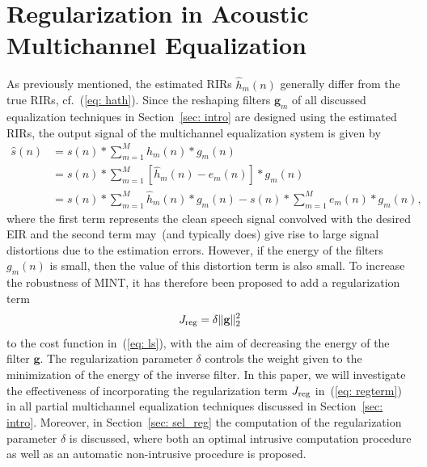 \documentclass[10pt]{IEEEtran}
\begin{document}
\section{Regularization in Acoustic Multichannel Equalization}
\label{sec: reg}
As previously mentioned, the estimated RIRs $\hat{h}_m(n)$ generally differ from the true RIRs, cf.~(\ref{eq: hath}).
Since the reshaping filters $\mathbf{g}_m$ of all discussed equalization techniques in Section~\ref{sec: intro} are designed using the estimated RIRs, the output signal of the multichannel equalization system is given by
\begin{align}
\hat{s}(n)  &= s(n) \ast \sum_{m=1}^M h_m(n) \ast g_m(n) \\
& = s(n) \ast \sum_{m=1}^M  \left[\hat{h}_m(n) - e_m(n)\right] \ast g_m(n) \\
\label{eq: 2}
& = s(n) \ast \sum_{m=1}^M \hat{h}_m(n) \ast g_m(n) - s(n) \ast \sum_{m=1}^M e_m(n) \ast g_m(n),
\end{align}
where the first term represents the clean speech signal convolved with the desired EIR and the second term may~(and typically does) give rise to large signal distortions due to the estimation errors.
However, if the energy of the filters $g_m(n)$ is small, then the value of this distortion term is also small.
To increase the robustness of MINT, it has therefore been proposed to add a regularization term
\begin{equation}
\label{eq: regterm}
J_{\rm reg} = \delta \|\mathbf{g}\|_2^2
\end{equation}
to the cost function in~(\ref{eq: ls}), with the aim of decreasing the energy of the filter $\mathbf{g}$.
The regularization parameter $\delta$ controls the weight given to the minimization of the energy of the inverse filter.
In this paper, we will investigate the effectiveness of incorporating the regularization term $J_{\rm reg}$ in~(\ref{eq: regterm}) in all partial multichannel equalization techniques discussed in Section~\ref{sec: intro}.
Moreover, in Section~\ref{sec: sel_reg} the computation of the regularization parameter $\delta$ is discussed, where both an optimal intrusive computation procedure as well as an automatic non-intrusive procedure is proposed.
\end{document}
